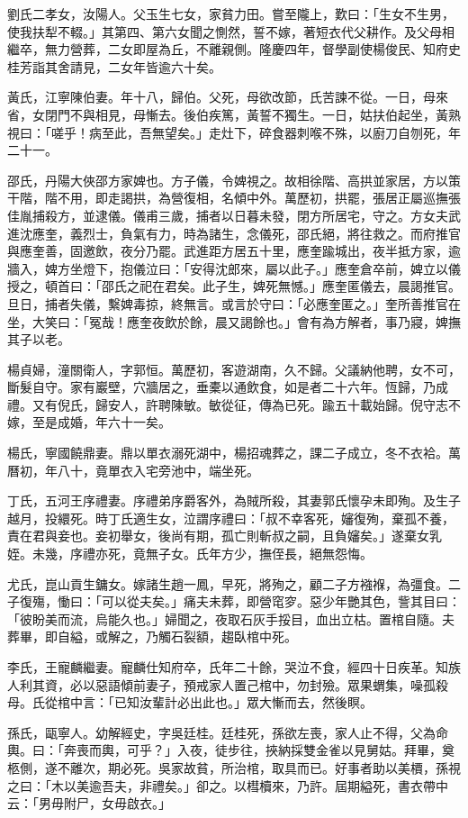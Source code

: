\begin{pinyinscope}
劉氏二孝女，汝陽人。父玉生七女，家貧力田。嘗至隴上，歎曰：「生女不生男，使我扶犁不輟。」其第四、第六女聞之惻然，誓不嫁，著短衣代父耕作。及父母相繼卒，無力營葬，二女即屋為丘，不離親側。隆慶四年，督學副使楊俊民、知府史桂芳詣其舍請見，二女年皆逾六十矣。

黃氏，江寧陳伯妻。年十八，歸伯。父死，母欲改節，氏苦諫不從。一日，母來省，女閉門不與相見，母慚去。後伯疾篤，黃誓不獨生。一日，姑扶伯起坐，黃熟視曰：「嗟乎！病至此，吾無望矣。」走灶下，碎食器刺喉不殊，以廚刀自刎死，年二十一。

邵氏，丹陽大俠邵方家婢也。方子儀，令婢視之。故相徐階、高拱並家居，方以策干階，階不用，即走謁拱，為營復相，名傾中外。萬歷初，拱罷，張居正屬巡撫張佳胤捕殺方，並逮儀。儀甫三歲，捕者以日暮未發，閉方所居宅，守之。方女夫武進沈應奎，義烈士，負氣有力，時為諸生，念儀死，邵氏絕，將往救之。而府推官與應奎善，固邀飲，夜分乃罷。武進距方居五十里，應奎踰城出，夜半抵方家，逾牆入，婢方坐燈下，抱儀泣曰：「安得沈郎來，屬以此子。」應奎倉卒前，婢立以儀授之，頓首曰：「邵氏之祀在君矣。此子生，婢死無憾。」應奎匿儀去，晨謁推官。旦日，捕者失儀，繫婢毒掠，終無言。或言於守曰：「必應奎匿之。」奎所善推官在坐，大笑曰：「冤哉！應奎夜飲於餘，晨又謁餘也。」會有為方解者，事乃寢，婢撫其子以老。

楊貞婦，潼關衛人，字郭恒。萬歷初，客遊湖南，久不歸。父議納他聘，女不可，斷髮自守。家有巖壁，穴牆居之，垂橐以通飲食，如是者二十六年。恆歸，乃成禮。又有倪氏，歸安人，許聘陳敏。敏從征，傳為已死。踰五十載始歸。倪守志不嫁，至是成婚，年六十一矣。

楊氏，寧國饒鼎妻。鼎以單衣溺死湖中，楊招魂葬之，課二子成立，冬不衣袷。萬曆初，年八十，竟單衣入宅旁池中，端坐死。

丁氏，五河王序禮妻。序禮弟序爵客外，為賊所殺，其妻郭氏懷孕未即殉。及生子越月，投繯死。時丁氏適生女，泣謂序禮曰：「叔不幸客死，嬸復殉，棄孤不養，責在君與妾也。妾初舉女，後尚有期，孤亡則斬叔之嗣，且負嬸矣。」遂棄女乳姪。未幾，序禮亦死，竟無子女。氏年方少，撫侄長，絕無怨悔。

尤氏，崑山貢生鏞女。嫁諸生趙一鳳，早死，將殉之，顧二子方襁褓，為彊食。二子復殤，慟曰：「可以從夫矣。」痛夫未葬，即營窀穸。惡少年艷其色，訾其目曰：「彼盼美而流，烏能久也。」婦聞之，夜取石灰手挼目，血出立枯。置棺自隨。夫葬畢，即自縊，或解之，乃觸石裂額，趨臥棺中死。

李氏，王寵麟繼妻。寵麟仕知府卒，氏年二十餘，哭泣不食，經四十日疾革。知族人利其資，必以惡語傾前妻子，預戒家人置己棺中，勿封殮。眾果蝟集，噪孤殺母。氏從棺中言：「已知汝輩計必出此也。」眾大慚而去，然後瞑。

孫氏，甌寧人。幼解經史，字吳廷桂。廷桂死，孫欲左喪，家人止不得，父為命輿。曰：「奔喪而輿，可乎？」入夜，徒步往，挾納採雙金雀以見舅姑。拜畢，奠柩側，遂不離次，期必死。吳家故貧，所治棺，取具而已。好事者助以美檟，孫視之曰：「木以美逾吾夫，非禮矣。」卻之。以槥櫝來，乃許。屆期縊死，書衣帶中云：「男毋附尸，女毋啟衣。」


\end{pinyinscope}
